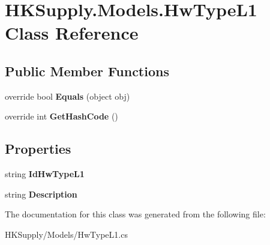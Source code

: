 \hypertarget{class_h_k_supply_1_1_models_1_1_hw_type_l1}{}\section{H\+K\+Supply.\+Models.\+Hw\+Type\+L1 Class Reference}
\label{class_h_k_supply_1_1_models_1_1_hw_type_l1}
\subsection*{Public Member Functions}
\begin{DoxyCompactItemize}
\item 
\mbox{\label{class_h_k_supply_1_1_models_1_1_hw_type_l1_ad3e6dc233ad35eb0a3dcb46071aa76f0}} 
override bool {\bfseries Equals} (object obj)
\item 
\mbox{\label{class_h_k_supply_1_1_models_1_1_hw_type_l1_a542b564e68f2afa648622ef06bb9074b}} 
override int {\bfseries Get\+Hash\+Code} ()
\end{DoxyCompactItemize}
\subsection*{Properties}
\begin{DoxyCompactItemize}
\item 
\mbox{\label{class_h_k_supply_1_1_models_1_1_hw_type_l1_ad29992f4ed14f2af0a600078becdf04a}} 
string {\bfseries Id\+Hw\+Type\+L1}
\item 
\mbox{\label{class_h_k_supply_1_1_models_1_1_hw_type_l1_a1ab1fe9872d4c41399f6e255262bdbf3}} 
string {\bfseries Description}
\end{DoxyCompactItemize}


The documentation for this class was generated from the following file\+:\begin{DoxyCompactItemize}
\item 
H\+K\+Supply/\+Models/Hw\+Type\+L1.\+cs\end{DoxyCompactItemize}
